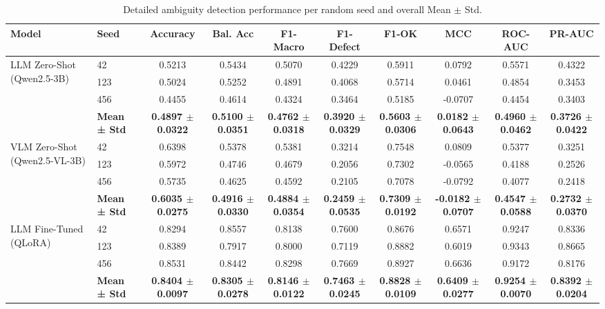 \begin{table}[t]
\centering
\small
\caption{Detailed ambiguity detection performance per random seed and overall Mean $\pm$ Std.}
\label{tab:per_seed_results}
\begin{tabular}{llcccccccc}
\hline
\textbf{Model} & \textbf{Seed} & \textbf{Accuracy} & \textbf{Bal. Acc} & \textbf{F1-Macro} & \textbf{F1-Defect} & \textbf{F1-OK} & \textbf{MCC} & \textbf{ROC-AUC} & \textbf{PR-AUC} \\
\hline
\multirow{4}{*}{LLM Zero-Shot (Qwen2.5-3B)} & 42 & 0.5213 & 0.5434 & 0.5070 & 0.4229 & 0.5911 & 0.0792 & 0.5571 & 0.4322 \\
 & 123 & 0.5024 & 0.5252 & 0.4891 & 0.4068 & 0.5714 & 0.0461 & 0.4854 & 0.3453 \\
 & 456 & 0.4455 & 0.4614 & 0.4324 & 0.3464 & 0.5185 & -0.0707 & 0.4454 & 0.3403 \\
 & \textbf{Mean ± Std} & \textbf{0.4897 $\pm$ 0.0322} & \textbf{0.5100 $\pm$ 0.0351} & \textbf{0.4762 $\pm$ 0.0318} & \textbf{0.3920 $\pm$ 0.0329} & \textbf{0.5603 $\pm$ 0.0306} & \textbf{0.0182 $\pm$ 0.0643} & \textbf{0.4960 $\pm$ 0.0462} & \textbf{0.3726 $\pm$ 0.0422} \\
\hline
\multirow{4}{*}{VLM Zero-Shot (Qwen2.5-VL-3B)} & 42 & 0.6398 & 0.5378 & 0.5381 & 0.3214 & 0.7548 & 0.0809 & 0.5377 & 0.3251 \\
 & 123 & 0.5972 & 0.4746 & 0.4679 & 0.2056 & 0.7302 & -0.0565 & 0.4188 & 0.2526 \\
 & 456 & 0.5735 & 0.4625 & 0.4592 & 0.2105 & 0.7078 & -0.0792 & 0.4077 & 0.2418 \\
 & \textbf{Mean ± Std} & \textbf{0.6035 $\pm$ 0.0275} & \textbf{0.4916 $\pm$ 0.0330} & \textbf{0.4884 $\pm$ 0.0354} & \textbf{0.2459 $\pm$ 0.0535} & \textbf{0.7309 $\pm$ 0.0192} & \textbf{-0.0182 $\pm$ 0.0707} & \textbf{0.4547 $\pm$ 0.0588} & \textbf{0.2732 $\pm$ 0.0370} \\
\hline
\multirow{4}{*}{LLM Fine-Tuned (QLoRA)} & 42 & 0.8294 & 0.8557 & 0.8138 & 0.7600 & 0.8676 & 0.6571 & 0.9247 & 0.8336 \\
 & 123 & 0.8389 & 0.7917 & 0.8000 & 0.7119 & 0.8882 & 0.6019 & 0.9343 & 0.8665 \\
 & 456 & 0.8531 & 0.8442 & 0.8298 & 0.7669 & 0.8927 & 0.6636 & 0.9172 & 0.8176 \\
 & \textbf{Mean ± Std} & \textbf{0.8404 $\pm$ 0.0097} & \textbf{0.8305 $\pm$ 0.0278} & \textbf{0.8146 $\pm$ 0.0122} & \textbf{0.7463 $\pm$ 0.0245} & \textbf{0.8828 $\pm$ 0.0109} & \textbf{0.6409 $\pm$ 0.0277} & \textbf{0.9254 $\pm$ 0.0070} & \textbf{0.8392 $\pm$ 0.0204} \\

\end{tabular}
\end{table}
